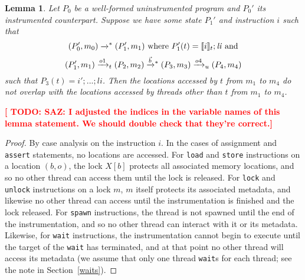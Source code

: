 \documentclass[preprint, 10pt]{sigplanconf}
\newcommand{\TODO}[1]{\textbf{\textcolor{red}{[ TODO: #1]}}}
\newcommand{\meanl}{\ensuremath{[ \! [}}
\newcommand{\meanr}{\ensuremath{] \! ]}}
\newcommand{\means}[1]{\ensuremath{\meanl #1 \meanr}}
\newcommand{\instr}[2]{\ensuremath{\means{#2}_{#1}}}
\newcommand{\cfg}[2]{\ensuremath{(#1, #2)}}
\newcommand{\anarrow}[2]{\ensuremath{\xrightarrow{#2}_{#1}}}
\newcommand{\exec}[5]{\ensuremath{\cfg{#1}{#2} \anarrow{#3}{#4} #5}}
\newcommand{\execstar}[4]{\ensuremath{\cfg{#1}{#2} \tto{#3} #4}}
\newcommand{\execs}[3]{\ensuremath{ \xrightarrow{#2}_{#1} #3}}
\newcommand{\execstars}[2]{\ensuremath{ \tto{#1} #2}}
\newcommand{\tto}[1]{\mathrel{
  \vphantom{\xrightarrow{#1}}
  \smash{\xrightarrow{#1}}
  \vphantom{\to}^{*}}
}
\newtheorem{lemma}{Lemma}
\begin{document}
\begin{lemma}\label{indep}Let $P_0$ be a well-formed uninstrumented program and $P_0'$ its instrumented counterpart. Suppose we have some state $P_1'$ and instruction $i$ such that \[\execstar{P_0'}{m_0}{}{(P_1', m_1)}\ \mathrm{where}\ P_1'(t) = \instr{t}{i}; \mathit{li} \ \mathrm{and}\] \[\exec{P_1'}{m_1}{t}{o1}{(P_2, m_2)} \execstars{\vec{b}}{(P_3, m_3)} \execs{u}{o4}{(P_4, m_4)}\] such that $P_3(t) = i'; ...; \mathit{li}$. Then the locations accessed by $t$ from $m_1$ to $m_4$ do not overlap with the locations accessed by threads other than $t$ from $m_1$ to $m_4$.\end{lemma}

\TODO{SAZ: I adjusted the indices in the variable names of this lemma statement.  We should double check that they're correct.}
\begin{proof}By case analysis on the instruction $i$. In the cases of assignment and \texttt{assert} statements, no locations are accessed. For \texttt{load} and \texttt{store} instructions on a location $(b, o)$, the lock $X[b]$ protects all associated memory locations, and so no other thread can access them until the lock is released. For \texttt{lock} and \texttt{unlock} instructions on a lock $m$, $m$ itself protects its associated metadata, and likewise no other thread can access until the instrumentation is finished and the lock released. For \texttt{spawn} instructions, the thread is not spawned until the end of the instrumentation, and so no other thread can interact with it or its metadata. Likewise, for \texttt{wait} instructions, the instrumentation cannot begin to execute until the target of the \texttt{wait} has terminated, and at that point no other thread will access its metadata (we assume that only one thread \texttt{wait}s for each thread; see the note in Section~\ref{waits}).\end{proof}
\end{document}
